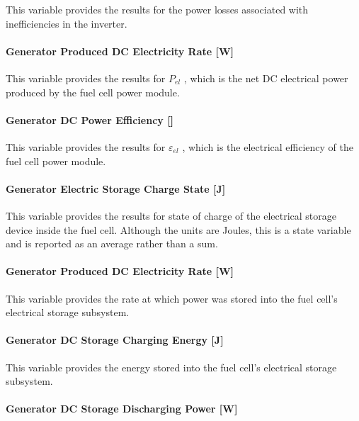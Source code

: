 This variable provides the results for the power losses associated with inefficiencies in the inverter.

\paragraph{Generator Produced DC Electricity Rate {[}W{]}}\label{generator-produced-dc-electric-power-w}

This variable provides the results for \({P_{el}}\) , which is the net DC electrical power produced by the fuel cell power module.

\paragraph{Generator DC Power Efficiency {[]}}\label{generator-dc-power-efficiency}

This variable provides the results for \({\varepsilon_{el}}\) , which is the electrical efficiency of the fuel cell power module.

\paragraph{Generator Electric Storage Charge State {[}J{]}}\label{generator-electric-storage-charge-state-j}

This variable provides the results for state of charge of the electrical storage device inside the fuel cell. Although the units are Joules, this is a state variable and is reported as an average rather than a sum.

\paragraph{Generator Produced DC Electricity Rate {[}W{]}}\label{generator-produced-dc-electric-power-w-1}

This variable provides the rate at which power was stored into the fuel cell's electrical storage subsystem.

\paragraph{Generator DC Storage Charging Energy {[}J{]}}\label{generator-dc-storage-charging-energy-j}

This variable provides the energy stored into the fuel cell's electrical storage subsystem.

\paragraph{Generator DC Storage Discharging Power {[}W{]}}\label{generator-dc-storage-discharging-power-w}

